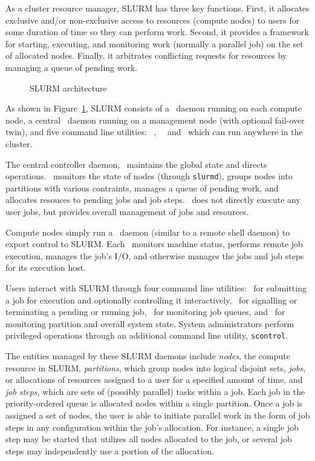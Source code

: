 \documentclass[10pt,onecolumn,times]{../common/llncs}
\begin{document}
{As a cluster resource manager, SLURM has three key functions.  First,
it allocates exclusive and/or non-exclusive access to resources (compute
nodes) to users for some duration of time so they can perform work.
Second, it provides a framework for starting, executing, and monitoring
work (normally a parallel job) on the set of allocated nodes.  Finally,
it arbitrates conflicting requests for resources by managing a queue of
pending work.

\begin{figure}[tb]
\centerline{}
\caption{\small SLURM architecture}
\label{arch}
\end{figure}

As shown in Figure~\ref{arch}, SLURM consists of a \slurmd\ daemon
running on each compute node, a central \slurmctld\ daemon running
on a management node (with optional fail-over twin), and five command
line utilities: \srun\, \scancel, \sinfo\, \squeue\, and \scontrol\, 
which can run anywhere in the cluster.

The central controller daemon, \slurmctld\, maintains the global
state and directs operations.
\slurmctld\ monitors the state of nodes (through {\tt slurmd}),
groups nodes into partitions with various contraints,  
manages a queue of pending work, and
allocates resouces to pending jobs and job steps.
\slurmctld\ does not directly execute any user jobs, but 
provides overall management of jobs and resources.
  
Compute nodes simply run a \slurmd\ daemon (similar to a remote 
shell daemon) to export control to SLURM.
Each \slurmd\ monitors machine status, 
performs remote job execution, manages the job's I/O, and otherwise 
manages the jobs and job steps for its execution host.

Users interact with SLURM through four command line utilities: 
\srun\ for submitting a job for execution and optionally controlling 
it interactively, 
\scancel\ for signalling or terminating a pending or running job,
\squeue\ for monitoring job queues, and 
\sinfo\ for monitoring partition and overall system state.  
System administrators perform privileged operations through an 
additional command line utility, {\tt scontrol}.

The entities managed by these SLURM daemons include {\em nodes}, the
compute resource in SLURM, {\em partitions}, which group nodes into
logical disjoint sets, {\em jobs}, or allocations of resources assigned
to a user for a specified amount of time, and {\em job steps}, which
are sets of (possibly parallel) tasks within a job.  Each job in the
priority-ordered queue is allocated nodes within a single partition.
Once a job is assigned a set of nodes, the user is able to initiate 
parallel work in the form of job steps in any configuration within 
the job's allocation. 
For instance, a single job step may be started that utilizes all nodes
allocated to the job, or several job steps may independently use a
portion of the allocation.

}
\end{document}
